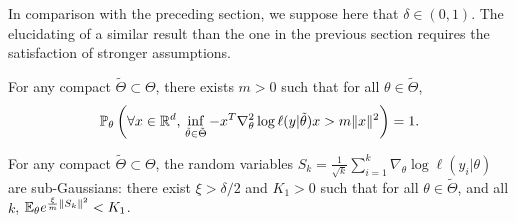 In comparison with the preceding section, we suppose here that $\delta\in(0,1)$.
The elucidating of a similar result than the one in the previous section requires the satisfaction of stronger assumptions.




\begin{assu}\label{assu:infeighes}
    For any compact $\tilde\Theta\subset\Theta$,
    there exists $m>0$ such that for all $\theta\in\tilde\Theta$,
    \begin{equation}
        \mathbb{P}_\theta\left(\forall x\in\mathbb{R}^d,\, \inf_{\tilde\theta\in\tilde\Theta}-x^T\nabla_\theta^2\log\ell(y|\tilde\theta)x>m\|x\|^2 \right) = 1.     
    \end{equation}
\end{assu}




\begin{assu}\label{assu:gausstailSk}
    For any compact $\tilde\Theta\subset\Theta$,
    the random variables
        $S_k=\frac{1}{\sqrt{k}}\sum_{i=1}^k\nabla_\theta\log\ell(y_i|\theta)    $
     are sub-Gaussians: there exist $\xi>\delta/2$ and $K_1>0$ such that for all $\theta\in\tilde\Theta$, and all $k$, $\mathbb{E}_\theta e^{\frac{\xi}{m}\|S_k\|^2}<K_1$.
\end{assu}







